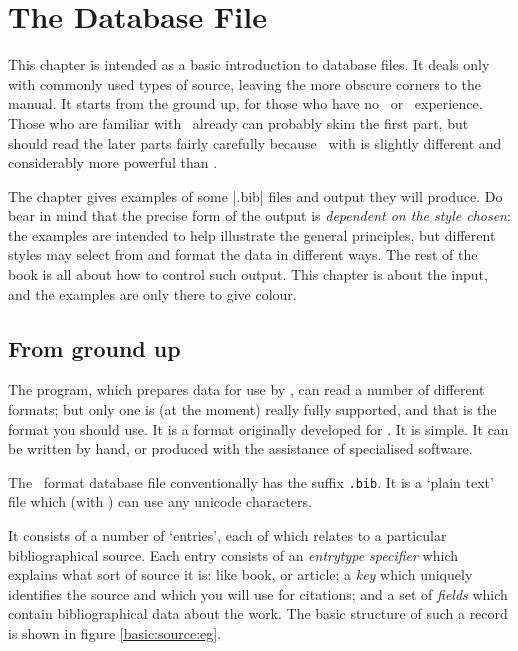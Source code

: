 \chapter{The Database File}\label{ch:database}

This chapter is intended as a basic introduction to database files. It
deals only with commonly used types of source, leaving the more
obscure corners to the manual. It starts from the ground up, for those
who have no \bibtex\ or \biblatex\ experience. Those who are familiar
with \bibtex\ already can probably skim the first part, but should
read the later parts fairly carefully because \biblatex\, with
 is slightly different and considerably more powerful
than \bibtex.

The chapter gives examples of some |.bib| files and output they will
produce. Do bear in mind that the precise form of the output is
\emph{dependent on the style chosen}: the examples are intended to
help illustrate the general principles, but different styles may
select from and format the data in different ways. The rest of the
book is all about how to control such output. This chapter is about
the input, and the examples are only there to give colour.

\section{From ground up}
%
The  program, which prepares data for use by \biblatex,
can read a number of different formats; but only one is (at the
moment) really fully supported, and that is the format you should
use. It is a format originally developed for \bibtex. It is simple. It
can be written by hand, or produced with the assistance of specialised
software.

The \bibtex\ format database file conventionally has the suffix
\verb|.bib|. It is a `plain text' file which (with )
can use any unicode characters.

It consists of a number of `entries', each of which relates to a
particular bibliographical source. Each entry consists of an
\emph{entrytype specifier} which explains what sort of source it is:
like book, or article; a \emph{key} which uniquely identifies the
source and which you will use for citations; and a set of
\emph{fields} which contain bibliographical data about the work. The
basic structure of such a record is shown in figure
\ref{basic:source:eg}.

